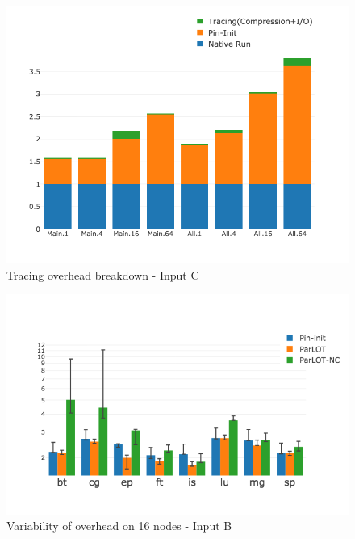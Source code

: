 \begin{figure}[t]
\centering
\includegraphics[width=.75\textwidth]{parlot/figs.comet.newMed/comet_chartDet_C_wc_byTool_p3_5.png}
\caption{ Tracing overhead breakdown - Input C}
\label{comet_chartDet_C_wc_byTool_p3_5}
\end{figure}



\begin{figure}[t]
\centering
\includegraphics[width=.75\textwidth]{parlot/figs.comet.newMed/comet_BX2_Main_16_B_p3_5.png}
\caption{ Variability of \parlotm overhead on 16 nodes - Input B}
\label{comet_BX2_Main_16_B_p3_5}
\end{figure}



